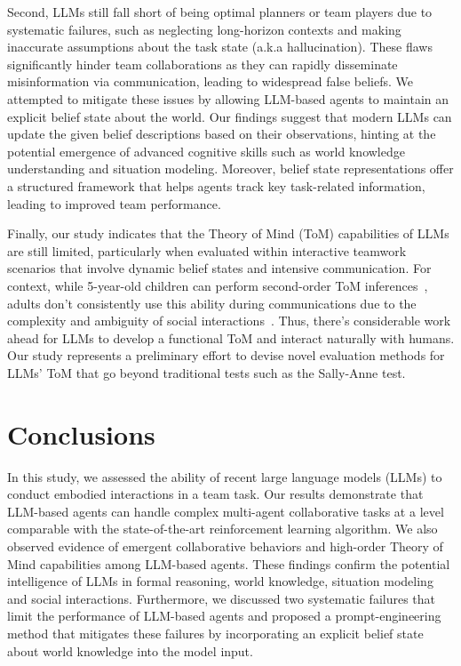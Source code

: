 \documentclass[11pt]{article}
\begin{document}
Second, LLMs still fall short of being optimal planners or team players due to systematic failures, such as neglecting long-horizon contexts and making inaccurate assumptions about the task state (a.k.a hallucination). These flaws significantly hinder team collaborations as they can rapidly disseminate misinformation via communication, leading to widespread false beliefs. We attempted to mitigate these issues by allowing LLM-based agents to maintain an explicit belief state about the world. Our findings suggest that modern LLMs can update the given belief descriptions based on their observations, hinting at the potential emergence of advanced cognitive skills such as world knowledge understanding and situation modeling. Moreover, belief state representations offer a structured framework that helps agents track key task-related information, leading to improved team performance.

Finally, our study indicates that the Theory of Mind (ToM) capabilities of LLMs are still limited, particularly when evaluated within interactive teamwork scenarios that involve dynamic belief states and intensive communication. For context, while 5-year-old children can perform second-order ToM inferences~\cite{miller2009children}, adults don't consistently use this ability during communications due to the complexity and ambiguity of social interactions~\cite{keysar2003limits}. Thus, there's considerable work ahead for LLMs to develop a functional ToM and interact naturally with humans. Our study represents a preliminary effort to devise novel evaluation methods for LLMs' ToM that go beyond traditional tests such as the Sally-Anne test.



\section{Conclusions}

In this study, we assessed the ability of recent large language models (LLMs) to conduct embodied interactions in a team task. Our results demonstrate that LLM-based agents can handle complex multi-agent collaborative tasks at a level comparable with the state-of-the-art reinforcement learning algorithm. We also observed evidence of emergent collaborative behaviors and high-order Theory of Mind capabilities among LLM-based agents. These findings confirm the potential intelligence of LLMs in formal reasoning, world knowledge, situation modeling and social interactions. Furthermore, we discussed two systematic failures that limit the performance of LLM-based agents and proposed a prompt-engineering method that mitigates these failures by incorporating an explicit belief state about world knowledge into the model input.
\end{document}
